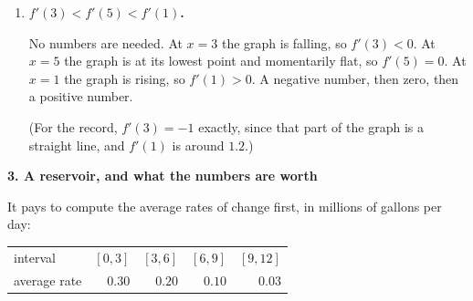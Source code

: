 \documentclass[11pt]{article}
\newcommand{\prob}[1]{\bigskip\noindent\textbf{\large #1}\par\smallskip}
\begin{document}
\begin{enumerate}
\item \textbf{$f'(3) < f'(5) < f'(1)$.}

No numbers are needed. At $x=3$ the graph is falling, so $f'(3)<0$. At $x=5$ the graph is at
its lowest point and momentarily flat, so $f'(5)=0$. At $x=1$ the graph is rising, so
$f'(1)>0$. A negative number, then zero, then a positive number.

(For the record, $f'(3)=-1$ exactly, since that part of the graph is a straight line, and
$f'(1)$ is around $1.2$.)
\end{enumerate}

\newpage
\prob{3. A reservoir, and what the numbers are worth}

It pays to compute the average rates of change first, in millions of gallons per day:

\smallskip
\begin{center}
\begin{tabular}{@{}lrrrr@{}}
\toprule
interval & $[0,3]$ & $[3,6]$ & $[6,9]$ & $[9,12]$\\
average rate & $0.30$ & $0.20$ & $0.10$ & $0.03$\\
\bottomrule
\end{tabular}
\end{center}
\end{document}
